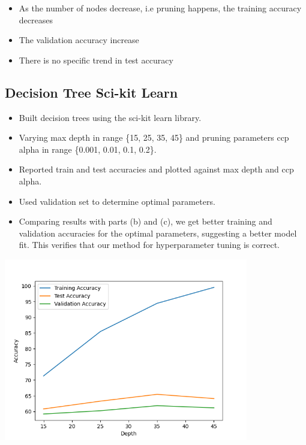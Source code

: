 \documentclass[12pt]{article}
\begin{document}
\begin{itemize}
    \item As the number of nodes decrease, i.e pruning happens, the training accuracy decreases
    \item The validation accuracy increase
    \item There is no specific trend in test accuracy
\end{itemize}

\subsection{Decision Tree Sci-kit Learn}
    \begin{itemize}
        \item Built decision trees using the sci-kit learn library.
        \item Varying max depth in range \{15, 25, 35, 45\} and pruning parameters ccp alpha in range \{0.001, 0.01, 0.1, 0.2\}.
        \item Reported train and test accuracies and plotted against max depth and ccp alpha.
        \item Used validation set to determine optimal parameters.
        \item Comparing results with parts (b) and (c), we get better training and validation accuracies for the optimal parameters, suggesting a better model fit. This verifies that our method for hyperparameter tuning is correct.
    \end{itemize}

\begin{center}
    \includegraphics[width=0.8\textwidth]{Assignment 3/q1/(d)depth_vs_accuracy.png}
\end{center}
\end{document}
